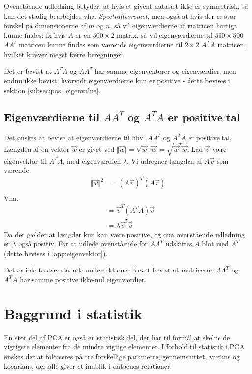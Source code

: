 Ovenstående udledning betyder, at hvis et givent datasæt ikke er symmetrisk, så kan det stadig bearbejdes vha. \emph{Spectralteoremet}, men også at hvis der er stor forskel på dimensionerne af $m$ og $n$, så vil eigenværdierne af matricen hurtigt kunne findes; fx hvis $A$ er en $500 \times 2$ matrix, så vil eigenværdierne til $500 \times 500$ $AA^t$ matricen kunne findes som værende eigenværdierne til $2 \times 2$ $A^TA$ matricen, hvilket kræver meget færre beregninger.

Det er bevist at $A^TA$ og $AA^T$ har samme eigenvektorer og eigenværdier, men endnu ikke bevist, hvorvidt eigenværdierne kun er positive - dette bevises i sektion \vref{subsec:pos_eigenvalue}.

\subsection*{Eigenværdierne til $AA^T$ og $A^TA$ er positive tal} \label{subsec:pos_eigenvalue}
Det ønskes at bevise at eigenværdierne til hhv. $AA^T$ og $A^TA$ er positive tal. Længden af en vektor $\vec{w}$ er givet ved $\Vert \vec{w} \Vert= \sqrt{\vec{w} \cdot \vec{w}} = \sqrt{\vec{w}^T\vec{w}}$. Lad $\vec{v}$ være eigenvektor til $A^TA$, med eigenværdien $\lambda$. Vi udregner længden af $A\vec{v}$ som værende
\begin{align}
\Vert \vec{w} \Vert^2 & = (A\vec{v})^T (A\vec{v}) \\
\end{align}
Vha. 
\begin{align}
	& = \vec{v}^T(A^T A ) \vec{v} \\	
	& = \lambda \vec{v}^T \vec{v}
\end{align}
Da det gælder at længder kun kan være positive, og qua ovenstående udledning er $\lambda$ også positiv. For at udlede ovenstående for $AA^T$ udskiftes $A$ blot med $A^T$ (dette bevises i \ref{app:eigenvektor}).

Det er i de to ovenstående undersektioner blevet bevist at matricerne $AA^T$ og $A^TA$ har samme positive ikke-nul eigenværdier.

\section{Baggrund i statistik}
En stor del af PCA er også en statistisk del, der har til formål at skelne de vigtigste elementer fra de mindre vigtige elementer. I forhold til statistik i PCA ønskes der at fokuseres på tre forskellige parametre; gennemsnittet, varians og kovarians, der alle giver et indblik i dataenes relationer.

